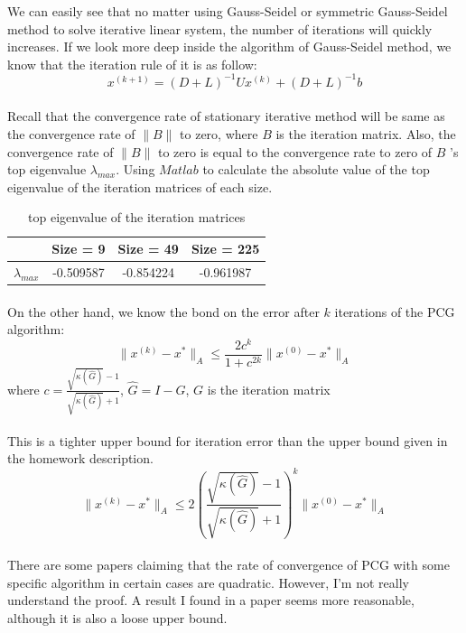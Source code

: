\documentclass{article}
\begin{document}
We can easily see that no matter using Gauss-Seidel or symmetric Gauss-Seidel method to solve iterative linear system, the number of iterations will quickly increases.
If we look more deep inside the algorithm of Gauss-Seidel method, we know that the iteration rule of it is as follow:
$$x^{(k+1)} = (D+L)^{-1}Ux^{(k)} + (D+L)^{-1}b$$

\paragraph{}
Recall that the convergence rate of stationary iterative method will be same as the convergence rate of $\|B\|$ to zero, where $B$ is the iteration matrix. Also, the convergence rate of $\|B\|$ to zero is equal to the convergence rate to zero of $B$ 's top eigenvalue $\lambda_{max}$. Using $Matlab$ to calculate the absolute value of the top eigenvalue of the iteration matrices of each size. 
\begin{table}[h]
\begin{center}
\begin{tabular}[c]{lccc}
\hline
 & Size = 9 & Size = 49 & Size = 225 \\
\hline
$\lambda_{max}$ & -0.509587 & -0.854224& -0.961987 \\
\hline
\end{tabular}
\caption{top eigenvalue of the iteration matrices}
\end{center}
\end{table}

\paragraph{}
On the other hand, we know the bond on the error after $k$ iterations of the PCG algorithm:\cite[pp.155-156]{QSS07}
$$\|x^{(k)}-x^*\|_A \leq \frac{2c^k}{1+c^{2k}}\|x^{(0)}-x^*\|_A$$
where
$c = \frac{\sqrt{\kappa(\hat{G})}-1}{\sqrt{\kappa(\hat{G})}+1}$, $\hat{G} = I - G$, $G$ is the iteration matrix
\paragraph{}
This is a tighter upper bound for iteration error than the upper bound given in the homework description.
$$\|x^{(k)}-x^*\|_A \leq 2(\frac{\sqrt{\kappa(\hat{G})}-1}{\sqrt{\kappa(\hat{G})}+1})^k\|x^{(0)}-x^*\|_A$$

\paragraph{}
There are some papers claiming that the rate of convergence of PCG with some specific algorithm in certain cases are quadratic. However, I'm not really understand the proof. A result I found in a paper\cite{CG} seems more reasonable, although it is also a loose upper bound. 
\end{document}

